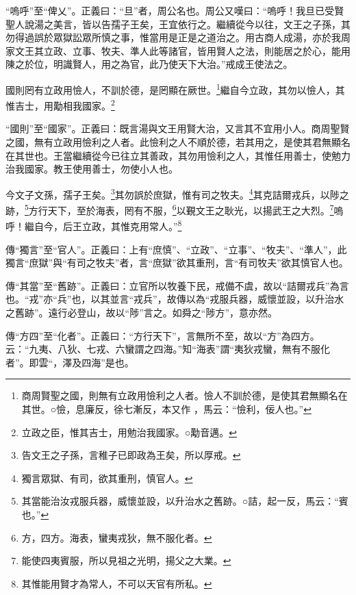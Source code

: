 {\noindent\shu{}\fzkt “嗚呼”至“俾乂”。正義曰：“旦”者，周公名也。周公又嘆曰：“嗚呼！我旦已受賢聖人說湯之美言，皆以告孺子王矣，王宜依行之。繼續從今以往，文王之子孫，其勿得過誤於眾獄訟眾所慎之事，惟當用是正是之道治之。用古商人成湯，亦於我周家文王其立政、立事、牧夫、準人此等諸官，皆用賢人之法，則能居之於心，能用陳之於位，明識賢人，用之為官，此乃使天下大治。”戒成王使法之。 \par}

國則罔有立政用憸人，不訓於德，是罔顯在厥世。\footnote{商周賢聖之國，則無有立政用憸利之人者。憸人不訓於德，是使其君無顯名在其世。○憸，息廉反，徐七漸反，本又作 ，馬云：“憸利，佞人也。”}繼自今立政，其勿以憸人，其惟吉士，用勱相我國家。\footnote{立政之臣，惟其吉士，用勉治我國家。○勱音邁。}

{\noindent\shu{}\fzkt “國則”至“國家”。正義曰：既言湯與文王用賢大治，又言其不宜用小人。商周聖賢之國，無有立政用憸利之人者。此憸利之人不順於德，若其用之，是使其君無顯名在其世也。王當繼續從今已往立其善政，其勿用憸利之人，其惟任用善士，使勉力治我國家。教王使用善士，勿使小人也。 \par}

今文子文孫，孺子王矣。\footnote{告文王之子孫，言稚子已即政為王矣，所以厚戒。}其勿誤於庶獄，惟有司之牧夫。\footnote{獨言眾獄、有司，欲其重刑，慎官人。}其克詰爾戎兵，以陟之跡，\footnote{其當能治汝戎服兵器，威懷並設，以升治水之舊跡。○詰，起一反，馬云：“賓也。”}方行天下，至於海表，罔有不服，\footnote{方，四方。海表，蠻夷戎狄，無不服化者。}以覲文王之耿光，以揚武王之大烈。\footnote{能使四夷賓服，所以見祖之光明，揚父之大業。}嗚呼！繼自今，后王立政，其惟克用常人。”\footnote{其惟能用賢才為常人，不可以天官有所私。}


{\noindent\zhuan{}\fzbyks 傳“獨言”至“官人”。正義曰：上有“庶慎”、“立政”、“立事”、“牧夫”、“準人”，此獨言“庶獄”與“有司之牧夫”者，言“庶獄”欲其重刑，言“有司牧夫”欲其慎官人也。 \par}

{\noindent\zhuan{}\fzbyks 傳“其當”至“舊跡”。正義曰：立官所以牧養下民，戒備不虞，故以“詰爾戎兵”為言也。“戎”亦“兵”也，以其並言“戎兵”，故傳以為“戎服兵器，威懷並設，以升治水之舊跡”。遠行必登山，故以“陟”言之。如舜之“陟方”，意亦然。 \par}

{\noindent\zhuan{}\fzbyks 傳“方四”至“化者”。正義曰：“方行天下”，言無所不至，故以“方”為四方。云：“九夷、八狄、七戎、六蠻謂之四海。”知“海表”謂“夷狄戎蠻，無有不服化者”。即雲“，澤及四海”是也。 \par}

